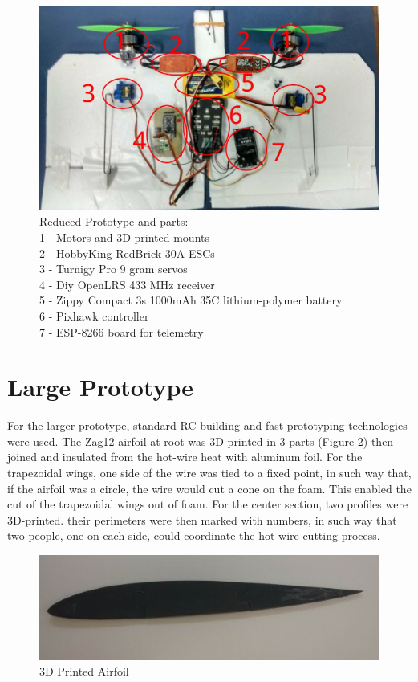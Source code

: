 \begin{figure}[H]
\centering
  \includegraphics[width=\linewidth]{figs/reducedprototype.jpg}
  \caption{Reduced Prototype and parts:\\
   1 - Motors and 3D-printed mounts\\
   2 - HobbyKing RedBrick 30A ESCs\\
   3 - Turnigy Pro 9 gram servos\\
   4 - Diy OpenLRS 433 MHz receiver\\
   5 - Zippy Compact 3s 1000mAh 35C lithium-polymer battery\\
   6 - Pixhawk controller\\
   7 - ESP-8266 board for telemetry}
  \label{fig:smallprototypeparts}
\end{figure}

\section{Large Prototype}

For the larger prototype, standard RC building and fast prototyping technologies were used.
The Zag12 airfoil at root was 3D printed in 3 parts (Figure \ref{fig:printedairfoil}) then joined and insulated from the hot-wire heat with aluminum foil. For the trapezoidal wings, one side of the wire was tied to a fixed point, in such way that, if the airfoil was a circle, the wire would cut a cone on the foam. This enabled the cut of the trapezoidal wings out of foam. For the center section, two profiles were 3D-printed. their perimeters were then marked with numbers, in such way that two people, one on each side, could coordinate the hot-wire cutting process.

\begin{figure}[H]
\centering
  \includegraphics[width=\linewidth]{figs/printedairfoil.png}
  \caption{3D Printed Airfoil}
  \label{fig:printedairfoil}
\end{figure}



